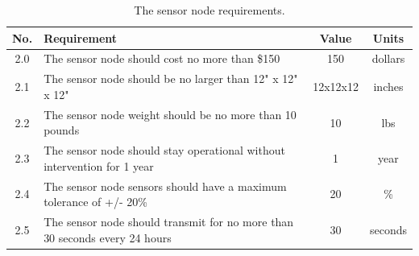 \documentclass[titlepage, 11pt, letterpaper]{article}
\begin{document}
\begin{table}[H]
\centering
\caption{The sensor node requirements.}
\begin{tabularx}{\linewidth}{|c|X|c|c|}
\hline
No. & Requirement & Value & Units \\
\hline\hline
2.0 & The sensor node should cost no more than \$150 & 150 & dollars \\\hline
2.1 & The sensor node should be no larger than 12" x 12" x 12" & 12x12x12 & inches \\\hline
2.2 & The sensor node weight should be no more than 10 pounds & 10 & lbs \\\hline
2.3 & The sensor node should stay operational without intervention for 1 year & 1 & year \\\hline
2.4 & The sensor node sensors should have a maximum tolerance of +/- 20\% & 20 & \% \\\hline
2.5 & The sensor node should transmit for no more than 30 seconds every 24 hours & 30 & seconds \\\hline


\end{tabularx}
\end{table}
\end{document}
